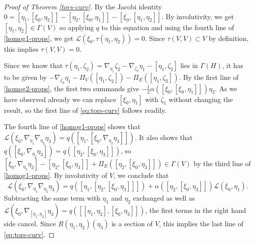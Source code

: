 \documentclass[10pt,a4paper]{amsart}
\begin{document}
\begin{proof}[Proof of Theorem \ref{tors-curv}]
    By the Jacobi identity $0=[\eta_1,[\xi_0,\eta_2]]-[\eta_2,[\xi_0,\eta_1]]-[\xi_0,[\eta_1,\eta_2]]$. By involutivity, we get $[\eta_1,\eta_2]\in\Gamma(V)$ so applying $q$ to this equation and using the fourth line of \eqref{homog1-props}, we get $\mathcal L(\xi_0,\tau(\eta_1,\eta_2))=0$. Since $\tau(V,V)\subset V$ by definition, this implies $\tau(V,V)=0$. 
    
    Since we know that $\tau(\eta_1,\zeta_2)=\nabla_{\eta_1}\zeta_2-\nabla_{\zeta_2}\eta_1-[\eta_1,\zeta_2]$ lies in $\Gamma(H)$, it has to be given by $-\nabla_{\zeta_2}\eta_1-\Pi_V([\eta_1,\zeta_2])-\Pi_E([\eta_1,\zeta_2])$. By the first line of \eqref{homog2-props}, the first two summands give $-\tfrac12\alpha([\xi_0,[\xi_0,\eta_1]])\eta_2$. As we have observed already we can replace $[\xi_0,\eta_1]$ with $\zeta_1$ without changing the result, so the first line of \eqref{eq:tors-curv} follows readily. 

    The fourth line of \eqref{homog1-props} shows that  
    $\mathcal L(\xi_0,\nabla_{\eta_1}\nabla_{\eta_2}\eta_3)=q([\eta_1,[\xi_0,\nabla_{\eta_2}\eta_3]])$.
    It also shows that $q([\xi_0,\nabla_{\eta_2}\eta_3])=q([\eta_2,[\xi_0,\eta_3]])$, so $[\xi_0,\nabla_{\eta_2}\eta_3]-[\eta_2,[\xi_0,\eta_3]]+\Pi_E([\eta_2,[\xi_0,\eta_3]])\in\Gamma(V)$ by the third line of \eqref{homog1-props}. By involutivity of $V$, we conclude that
    $$
    \mathcal L(\xi_0,\nabla_{\eta_1}\nabla_{\eta_2}\eta_3)=q([\eta_1,[\eta_2,[\xi_0,\eta_3]]]) + \alpha([\eta_2,[\xi_0,\eta_3]])\mathcal L(\xi_0,\eta_1). 
    $$
    Subtracting the same term with $\eta_1$ and $\eta_2$ exchanged as well as $\mathcal L(\xi_0,\nabla_{[\eta_1,\eta_2]}\eta_3)=q([[\eta_1,\eta_2],[\xi_0,\eta_3]])$, the first terms in the right hand side cancel. Since $R(\eta_1,\eta_2)(\eta_3)$ is a section of $V$, this implies the last line of \eqref{eq:tors-curv}. 


\end{proof}
\end{document}
